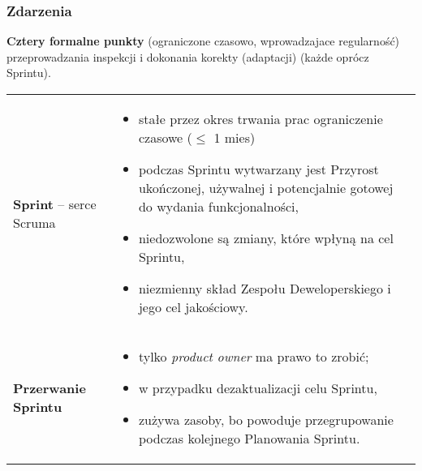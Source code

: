 \documentclass[../main.tex]{subfiles}
\begin{document}
    \subsubsection{Zdarzenia}
    \textbf{Cztery formalne punkty} (ograniczone czasowo, wprowadzajace regularność) przeprowadzania inspekcji i dokonania korekty (adaptacji) (każde oprócz Sprintu).


    \begin{table}[H]
        \begin{center}
            \begin{tabular}{ p{} p{} }
                \textbf{Sprint} – serce Scruma
                &
                \begin{itemize}
                    \item stałe przez okres trwania prac ograniczenie czasowe ($\leq$ 1 mies)
                    \item podczas Sprintu wytwarzany jest Przyrost ukończonej,
                    używalnej i potencjalnie gotowej do wydania funkcjonalności,
                    \item niedozwolone są zmiany, które wpłyną na cel Sprintu,
                    \item niezmienny skład Zespołu Deweloperskiego i jego cel jakościowy.
                \end{itemize}
                \\

                \cmidrule(r){1-1}\cmidrule(l){2-2}
                \textbf{Przerwanie Sprintu}
                &
                \begin{itemize}
                    \item tylko \textit{product owner} ma prawo to zrobić;
                    \item w przypadku dezaktualizacji celu Sprintu,
                    \item zużywa zasoby, bo powoduje przegrupowanie podczas kolejnego Planowania
                    Sprintu.
                \end{itemize}
                \\


\end{tabular}
\end{center}
\end{table}
\end{document}
